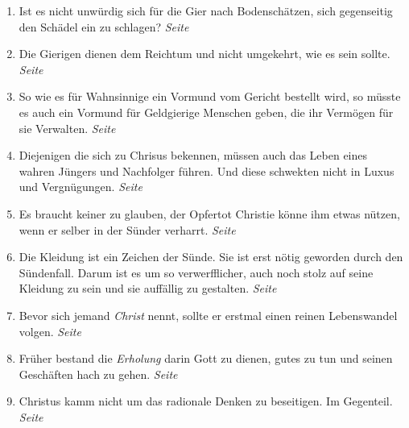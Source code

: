 \begin{enumerate}
 \item Ist es nicht unwürdig sich für die Gier nach Bodenschätzen, sich
gegenseitig den Schädel ein zu schlagen?
 \dotfill \textit{Seite \pageref{ref:13_21_Kapitalisten_kritik}}\\

 \item Die Gierigen dienen dem Reichtum und nicht umgekehrt, wie es sein sollte.
 \dotfill \textit{Seite \pageref{ref:13_21_Kapitalisten_dienerschaft}}\\

 \item So wie es für Wahnsinnige ein Vormund vom Gericht bestellt wird, so
müsste es auch ein Vormund für Geldgierige Menschen geben, die ihr Vermögen für
sie Verwalten.
 \dotfill \textit{Seite \pageref{ref:13_22_wahnsinnige}}\\

 \item Diejenigen die sich zu Chrisus bekennen, müssen auch das Leben eines
wahren Jüngers und Nachfolger führen. Und diese schwekten nicht in Luxus und
Vergnügungen.
 \dotfill \textit{Seite \pageref{ref:14_01_wahre_nachfolger}}\\

 \item Es braucht keiner zu glauben, der Opfertot Christie könne ihm etwas
nützen, wenn er selber in der Sünder verharrt.
 \dotfill \textit{Seite \pageref{ref:14_01_wahre_nachfolger_suenetod}}\\

 \item Die Kleidung ist ein Zeichen der Sünde. Sie ist erst nötig geworden durch
den Sündenfall. Darum ist es um so verwerfflicher, auch noch stolz auf seine
Kleidung zu sein und sie auffällig zu gestalten.
 \dotfill \textit{Seite \pageref{ref:14_04_wahre_nachfolger_kleidung}}\\

 \item Bevor sich jemand \textit{Christ} nennt, sollte er erstmal einen reinen
Lebenswandel volgen.
 \dotfill \textit{Seite \pageref{ref:14_06_wahre_nachfolger_umkehr}}\\

 \item Früher bestand die \textit{Erholung} darin Gott zu dienen, gutes zu tun
und seinen Geschäften hach zu gehen.
 \dotfill \textit{Seite \pageref{ref:14_07_wahre_nachfolger_erholung}}\\

 \item Christus kamm nicht um das radionale Denken zu beseitigen. Im Gegenteil.
 \dotfill \textit{Seite \pageref{ref:14_08_wahre_nachfolger_rational}}\\


\end{enumerate}
